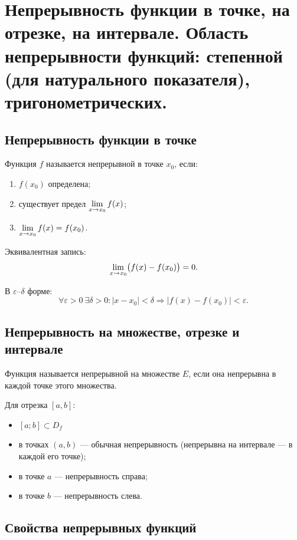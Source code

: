 \section{Непрерывность функции в точке, на отрезке, на интервале. Область
непрерывности функций: степенной (для натурального показателя),
тригонометрических.}

\subsection{Непрерывность функции в точке}

\begin{definition}
Функция $f$ называется непрерывной в точке $x_0$, если:
\begin{enumerate}
\item $f(x_0)$ определена;
\item существует предел $\lim\limits_{x \to x_0} f(x)$;
\item $\lim\limits_{x \to x_0} f(x)=f(x_0)$.
\end{enumerate}
\end{definition}

Эквивалентная запись:
\[
\lim\limits_{x \to x_0}\bigl(f(x)-f(x_0)\bigr)=0.
\]

В $\varepsilon$–$\delta$ форме:
\[
\forall \varepsilon>0\ \exists \delta>0:
|x-x_0|<\delta \Rightarrow |f(x)-f(x_0)|<\varepsilon.
\]

\subsection{Непрерывность на множестве, отрезке и интервале}

\begin{definition}
Функция называется непрерывной на множестве $E$, если она непрерывна в каждой точке этого множества.
\end{definition}

Для отрезка $[a,b]$:
\begin{itemize}
\item $[a;b] \subset D_f$
\item в точках $(a,b)$ — обычная непрерывность (непрерывна на интервале --- в каждой его точке);
\item в точке $a$ — непрерывность справа;
\item в точке $b$ — непрерывность слева.
\end{itemize}

\subsection{Свойства непрерывных функций}

